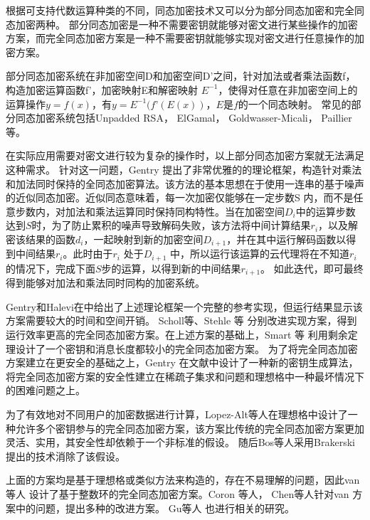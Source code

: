 根据可支持代数运算种类的不同，同态加密技术又可以分为部分同态加密和完全同态加密两种。
部分同态加密是一种不需要密钥就能够对密文进行某些操作的加密方案，而完全同态加密方案是一种不需要密钥就能够实现对密文进行任意操作的加密方案。

部分同态加密系统在非加密空间D和加密空间D’之间，针对加法或者乘法函数f，构造加密运算函数f’，加密映射E和解密映射
${E^{-1}}$，使得对任意在非加密空间上的运算操作$y=f(x)$，有$y=E^{-1}(f’(E(x))$，$E$是$f$的一个同态映射。
常见的部分同态加密系统包括Unpadded RSA，
ElGamal， Goldwasser-Micali，
Paillier 等。

在实际应用需要对密文进行较为复杂的操作时，以上部分同态加密方案就无法满足这种需求。
针对这一问题，Gentry 提出了非常优雅的的理论框架，构造针对乘法和加法同时保持的全同态加密算法。该方法的基本思想在于使用一连串的基于噪声的近似同态加密。近似同态意味着，每一次加密仅能够在一定步数S 内，而不是任意步数内，对加法和乘法运算同时保持同构特性。当在加密空间$D_i$中的运算步数达到$S$时，为了防止累积的噪声导致解码失败，该方法将中间计算结果$r_i$，以及解密该结果的函数$d_i$，一起映射到新的加密空间$D_{i+1}$，并在其中运行解码函数以得到中间结果$r_i$。此时由于$r_i$ 处于$D_{i+1}$ 中，所以运行该运算的云代理将在不知道$r_i$的情况下，完成下面$S$步的运算，以得到新的中间结果$r_{i+1}$。 如此迭代，即可最终得到能够对加法和乘法同时同构的加密系统。

Gentry和Halevi在中给出了上述理论框架一个完整的参考实现，但运行结果显示该方案需要较大的时间和空间开销。
Scholl等、Stehle 等 分别改进实现方案，得到运行效率更高的完全同态加密方案。在上述方案的基础上，Smart 等 利用剩余定理设计了一个密钥和消息长度都较小的完全同态加密方案。
为了将完全同态加密方案建立在更安全的基础之上，Gentry 在文献中设计了一种新的密钥生成算法，将完全同态加密方案的安全性建立在稀疏子集求和问题和理想格中一种最坏情况下的困难问题之上。

为了有效地对不同用户的加密数据进行计算，Lopez-Alt等人在理想格中设计了一种允许多个密钥参与的完全同态加密方案，该方案比传统的完全同态加密方案更加灵活、实用，其安全性却依赖于一个非标准的假设。
随后Bos等人采用Brakerski提出的技术消除了该假设。

上面的方案均是基于理想格或类似方法来构造的，存在不易理解的问题，因此van等人 设计了基于整数环的完全同态加密方案。Coron 等人，
Chen等人针对van 方案中的问题，提出多种的改进方案。
Gu等人 也进行相关的研究。

